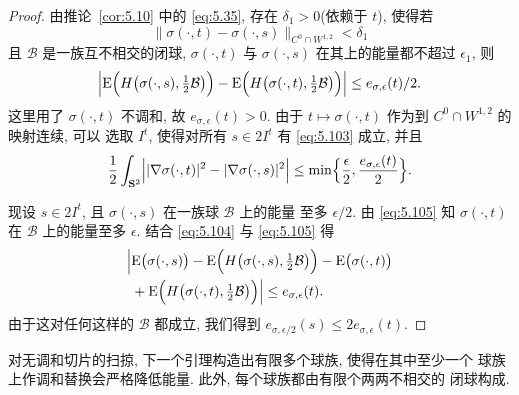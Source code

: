 \begin{proof}
由推论~\ref{cor:5.10} 中的 \eqref{eq:5.35}, 存在 $\delta_1>0$(依赖于
$t$), 使得若
\begin{equation}
\|\sigma(\cdot,t)-\sigma(\cdot,s)\|_{C^0\cap W^{1,2}}<\delta_1
\label{eq:5.103}
\end{equation}
且 $\mathcal{B}$ 是一族互不相交的闭球, $\sigma(\cdot,t)$ 与
$\sigma(\cdot,s)$ 在其上的能量都不超过 $\epsilon_1$, 则
\begin{equation}
\Bigl|\mathrm{E}\Bigl(H\bigl(\sigma(\cdot,s),\tfrac12\mathcal{B}\bigr)\Bigr)
-\mathrm{E}\Bigl(H\bigl(\sigma(\cdot,t),\tfrac12\mathcal{B}\bigr)\Bigr)\Bigr|
\leq e_{\sigma,\epsilon}(t)/2.
\label{eq:5.104}
\end{equation}
这里用了 $\sigma(\cdot,t)$ 不调和, 故 $e_{\sigma,\epsilon}(t)>0$. 由于
$t\mapsto\sigma(\cdot,t)$ 作为到 $C^0\cap W^{1,2}$ 的映射连续, 可以
选取 $I^t$, 使得对所有 $s\in 2I^t$ 有 \eqref{eq:5.103} 成立, 并且
\begin{equation}
\frac12\int_{\mathbf{S}^2}\Bigl||\nabla\sigma(\cdot,t)|^2
-|\nabla\sigma(\cdot,s)|^2\Bigr|
\leq\min\Bigl\{\frac{\epsilon}{2},\frac{e_{\sigma,\epsilon}(t)}{2}\Bigr\}.
\label{eq:5.105}
\end{equation}

现设 $s\in 2I^t$, 且 $\sigma(\cdot,s)$ 在一族球 $\mathcal{B}$ 上的能量
至多 $\epsilon/2$. 由 \eqref{eq:5.105} 知 $\sigma(\cdot,t)$ 在
$\mathcal{B}$ 上的能量至多 $\epsilon$. 结合 \eqref{eq:5.104} 与
\eqref{eq:5.105} 得
\begin{equation}
\begin{aligned}
\Bigl|&\mathrm{E}\bigl(\sigma(\cdot,s)\bigr)
-\mathrm{E}\Bigl(H\bigl(\sigma(\cdot,s),\tfrac12\mathcal{B}\bigr)\Bigr)
-\mathrm{E}\bigl(\sigma(\cdot,t)\bigr)\\
&+\mathrm{E}\Bigl(H\bigl(\sigma(\cdot,t),\tfrac12\mathcal{B}\bigr)\Bigr)
\Bigr|\leq e_{\sigma,\epsilon}(t).
\end{aligned}
\label{eq:5.106}
\end{equation}
由于这对任何这样的 $\mathcal{B}$ 都成立, 我们得到
$e_{\sigma,\epsilon/2}(s)\leq 2e_{\sigma,\epsilon}(t)$.
\end{proof}

对无调和切片的扫掠, 下一个引理构造出有限多个球族, 使得在其中至少一个
球族上作调和替换会严格降低能量. 此外, 每个球族都由有限个两两不相交的
闭球构成.


